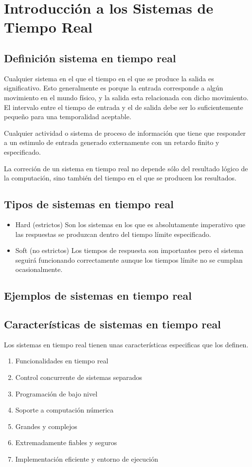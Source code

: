 \section{Introducción a los Sistemas de Tiempo Real}

\subsection{Definición sistema en tiempo real}

Cualquier sistema en el que el tiempo en el que se produce la salida es 
significativo. Esto generalmente es porque la entrada corresponde a algún 
movimiento en el mundo físico, y la salida esta relacionada con dicho 
movimiento. El intervalo entre el tiempo de entrada y el de salida debe ser
lo suficientemente pequeño para una temporalidad aceptable.

Cualquier actividad o sistema de proceso de información que tiene que responder
a un estimulo de entrada generado externamente con un retardo finito y
especificado.

La correción de un sistema en tiempo real no depende sólo del resultado 
lógico de la computación, sino también del tiempo en el que se producen los 
resultados.

\subsection{Tipos de sistemas en tiempo real}
\begin{itemize}
	\item Hard (estrictos) 
		Son los sistemas en los que es absolutamente imperativo
		que las respuestas se produzcan dentro del tiempo límite
		especificado.
	\item Soft (no estrictos)
		Los tiempos de respuesta son importantes pero el sistema
		seguirá funcionando correctamente aunque los tiempos límite
		no se cumplan ocasionalmente.
\end{itemize}
\subsection{Ejemplos de sistemas en tiempo real}

\subsection{Características de sistemas en tiempo real}

Los sistemas en tiempo real tienen unas características especificas que los
definen.

\begin{enumerate}
\item Funcionalidades en tiempo real
\item Control concurrente de sistemas separados
\item Programación de bajo nivel
\item Soporte a computación númerica
\item Grandes y complejos
\item Extremadamente fiables y seguros
\item Implementación eficiente y entorno de ejecución
\end{enumerate}
